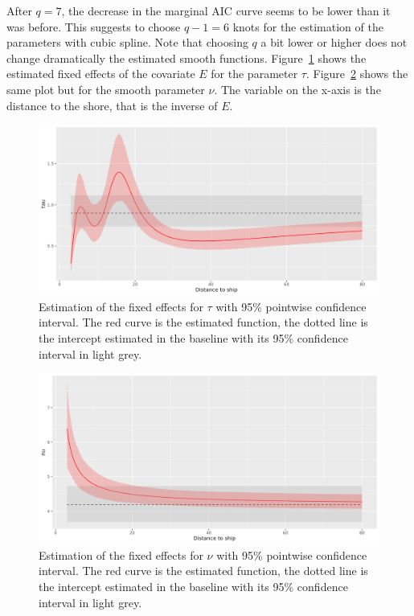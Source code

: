 \documentclass[11pt]{article}
\newcommand {\1}{\mathbb{1}}
\begin{document}
After $q=7$, the decrease in the marginal AIC curve seems to be lower than it was before. This suggests to choose $q-1=6$ knots for the estimation of the parameters with cubic spline. Note that choosing $q$ a bit lower or higher does not change dramatically the estimated smooth functions.
Figure~\ref{fig: fe_response3_tau_ExpShip} shows the estimated fixed effects of the covariate $E$ for the parameter $\tau$. Figure~\ref{fig: fe_response3_nu_ExpShip} shows the same plot but for the smooth parameter $\nu$. The variable on the x-axis is the distance to the shore, that is the inverse of $E$. 


\begin{figure}[H]
    \centering
    \includegraphics[scale=0.45]{images/unconstrained_models/response/fe_response3_tau_ExpShip.png}
    \caption{Estimation of the fixed effects for $\tau$ with 95\% pointwise confidence interval. The red curve is the estimated function, the dotted line is the intercept estimated in the baseline with its 95\% confidence interval in light grey.}
    \label{fig: fe_response3_tau_ExpShip}
\end{figure}

\begin{figure}[H]
	\centering
	\includegraphics[scale=0.45]{images/unconstrained_models/response/fe_response3_nu_ExpShip.png}
	\caption{Estimation of the fixed effects for $\nu$ with 95\% pointwise confidence interval. The red curve is the estimated function, the dotted line is the intercept estimated in the baseline with its 95\% confidence interval in light grey.}
	\label{fig: fe_response3_nu_ExpShip}
\end{figure}
\end{document}
